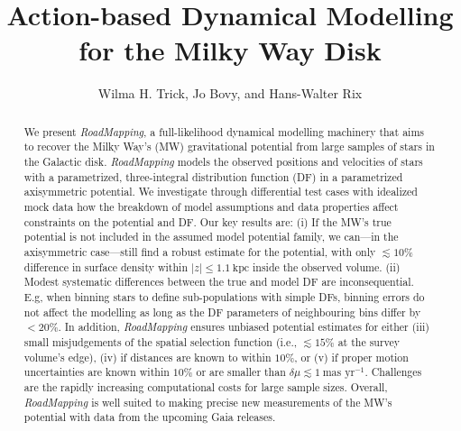 \documentclass[iop,revtex4,numberedappendix,appendixfloats]{emulateapj}
\newcommand{\RM}{{\sl RoadMapping}}
\begin{document}
\title{Action-based Dynamical Modelling for the Milky Way Disk\\}

\author{Wilma H. Trick, Jo Bovy, and Hans-Walter Rix}



\begin{abstract}
We present \RM{}, a full-likelihood dynamical modelling machinery that aims to recover the Milky Way's (MW) gravitational potential from large samples of stars in the Galactic disk. \RM{} models the observed positions and velocities of stars with a parametrized, three-integral distribution function (DF) in a parametrized axisymmetric potential. We investigate through differential test cases with idealized mock data how the breakdown of model assumptions and data properties affect constraints on the potential and DF. Our key results are: (i) If the MW's true potential is not included in the assumed model potential family, we can---in the axisymmetric case---still find a robust estimate for the potential, with only $\lesssim10\%$ difference in surface density within $|z| \leq1.1~\text{kpc}$ inside the observed volume. (ii) Modest systematic differences between the true and model DF are inconsequential. E.g, when binning stars to define sub-populations with simple DFs, binning errors do not affect the modelling as long as the DF parameters of neighbouring bins differ by $<20\%$. In addition, \RM{} ensures unbiased potential estimates for either (iii) small misjudgements of the spatial selection function (i.e., $\lesssim15\%$ at the survey volume's edge), (iv) if distances are known to within $10\%$, or (v) if proper motion uncertainties are known within $10\%$ or are smaller than $\delta \mu \lesssim 1~\text{mas yr}^{-1}$. Challenges are the rapidly increasing computational costs for large sample sizes. Overall, \RM{} is well suited to making precise new measurements of the MW's potential with data from the upcoming Gaia releases.
\end{abstract}
\end{document}
